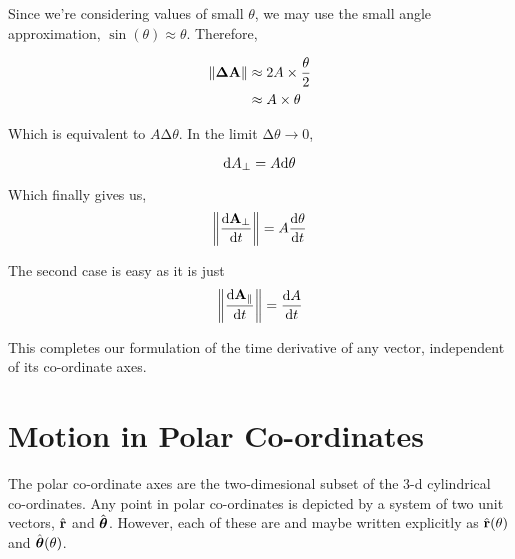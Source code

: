 
\begin{figure}
    [H]
    \centering
\end{figure}


Since we're considering values of small \(\theta\), we may use the small angle approximation,
\(\sin(\theta) \approx \theta\). Therefore,

\begin{align}
    \norm{\boldsymbol{\mathbf{\Delta A}}} &\approx 2A \times \frac{\theta}{2}\\ 
    &\approx A \times \theta
\end{align}

Which is equivalent to \(A \increment \theta\). In the limit \(\increment \theta \to 0\),

\begin{equation}
    \diffd{A_{\perp}} = A \diffd{\theta}
\end{equation}

Which finally gives us,
\begin{equation}
    \norm{\derivative{\vect{A}_{\perp}}{t}} = A\derivative{\theta}{t}
\end{equation}

The second case is easy as it is just 
\begin{equation}
    \norm{\derivative{\vect{A}_{\parallel}}{t}} = \derivative{A}{t}
\end{equation}
    
This completes our formulation of the time derivative of any vector, independent of its co-ordinate
axes.

\section{Motion in Polar Co-ordinates}

The polar co-ordinate axes are the two-dimesional subset of the 3-d cylindrical co-ordinates. 
Any point in polar co-ordinates is depicted by a system of two unit vectors, \({\hat{\boldsymbol{\mathbf{r}}}}\) and
\({\hat{\boldsymbol{\mathbf{\theta}}}}\). However, each of these are  and
maybe written explicitly as \({\hat{\boldsymbol{\mathbf{r}}}}(\theta)\) and \({\hat{\boldsymbol{\mathbf{\theta}}}}(\theta)\).  

